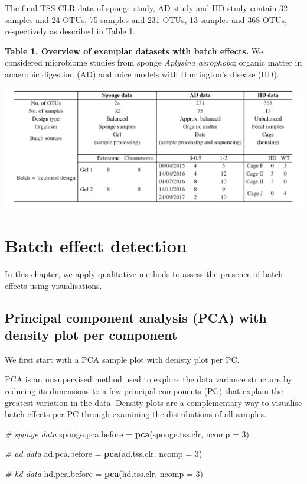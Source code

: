 \documentclass[]{book}
\newenvironment{Shaded}{\begin{snugshade}}{\end{snugshade}}
\newcommand{\KeywordTok}[1]{\textcolor[rgb]{0.13,0.29,0.53}{\textbf{#1}}}
\newcommand{\DataTypeTok}[1]{\textcolor[rgb]{0.13,0.29,0.53}{#1}}
\newcommand{\DecValTok}[1]{\textcolor[rgb]{0.00,0.00,0.81}{#1}}
\newcommand{\StringTok}[1]{\textcolor[rgb]{0.31,0.60,0.02}{#1}}
\newcommand{\CommentTok}[1]{\textcolor[rgb]{0.56,0.35,0.01}{\textit{#1}}}
\newcommand{\NormalTok}[1]{#1}
\begin{document}
The final TSS-CLR data of sponge study, AD study and HD study contain 32
samples and 24 OTUs, 75 samples and 231 OTUs, 13 samples and 368 OTUs,
respectively as described in Table 1.

\textbf{Table 1. Overview of exemplar datasets with batch effects.} We
considered microbiome studies from sponge \emph{Aplysina aerophoba};
organic matter in anaerobic digestion (AD) and mice models with
Huntington's disease (HD).

\begin{center}\includegraphics{figures/table} \end{center}

\chapter{Batch effect detection}\label{detect}

In this chapter, we apply qualitative methods to assess the presence of
batch effects using visualisations.

\section{Principal component analysis (PCA) with density plot per
component}\label{principal-component-analysis-pca-with-density-plot-per-component}

We first start with a PCA sample plot with denisty plot per PC.

PCA is an unsupervised method used to explore the data variance
structure by reducing its dimensions to a few principal components (PC)
that explain the greatest variation in the data. Density plots are a
complementary way to visualise batch effects per PC through examining
the distributions of all samples.

\begin{Shaded}
\begin{Highlighting}[]
\CommentTok{# sponge data}
\NormalTok{sponge.pca.before =}\StringTok{ }\KeywordTok{pca}\NormalTok{(sponge.tss.clr, }\DataTypeTok{ncomp =} \DecValTok{3}\NormalTok{)}

\CommentTok{# ad data}
\NormalTok{ad.pca.before =}\StringTok{ }\KeywordTok{pca}\NormalTok{(ad.tss.clr, }\DataTypeTok{ncomp =} \DecValTok{3}\NormalTok{)}

\CommentTok{# hd data}
\NormalTok{hd.pca.before =}\StringTok{ }\KeywordTok{pca}\NormalTok{(hd.tss.clr, }\DataTypeTok{ncomp =} \DecValTok{3}\NormalTok{)}
\end{Highlighting}
\end{Shaded}
\end{document}
